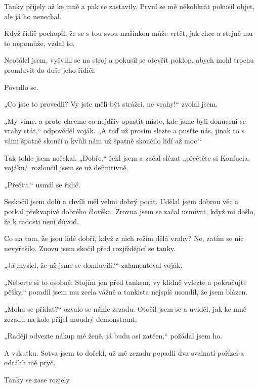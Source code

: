 Tanky přijely až ke mně a pak se zastavily. První se mě několikrát pokusil objet, ale já ho nenechal. 

Když řidič pochopil, že se s tou svou mašinkou může vrtět, jak chce a stejně mu to nepomůže, vzdal to. 

Neotálel jsem, vyšvihl se na stroj a pokusil se otevřít poklop, abych mohl trochu promluvit do duše jeho řidiči.

Povedlo se.

„Co jste to provedli? Vy jste měli být strážci, ne vrahy!“ zvolal jsem.

„My víme, a proto chceme co nejdřív opustit místo, kde jsme byli donuceni se vrahy stát,“ odpověděl voják. „A teď už prosím slezte a pusťte nás, jinak to s vámi špatně skončí a kvůli nám už špatně skončilo lidí až moc.“

Tak tohle jsem nečekal. „Dobře,“ řekl jsem a začal slézat „přečtěte si Konfucia, vojáku.“ rozloučil jsem se už definitivně.

„Přečtu,“ usmál se řidič.
	
 Seskočil jsem dolů a chvíli měl velmi dobrý pocit. Udělal jsem dobrou věc a potkal překvapivě dobrého člověka. Zrovna jsem se začal usmívat, když mi došlo, že k radosti není důvod.

Co na tom, že jsou lidé dobří, když z nich režim dělá vrahy? Ne, zatím se nic nevyřešilo. Znovu jsem skočil před rozjíždějící se tanky.

„Já myslel, že už jsme se domluvili?“ zalamentoval voják.

„Neberte si to osobně. Stojím jen před tankem, vy klidně vylezte a pokračujte pěšky,“ poradil jsem mu zcela vážně a tankista nejspíš usoudil, že jsem blázen.

„Mohu se přidat?“ ozvalo se náhle zezadu. Otočil jsem se a uviděl, jak ke mně zezadu na kole přijel moudrý demonstrant.

„Raději odvezte nákup mé ženě, já budu asi zatčen,“ požádal jsem ho.

A vskutku. Sotva jsem to dořekl, už mě zezadu popadli dva svalnatí pořízci a odtáhli mě pryč.

Tanky se zase rozjely. 